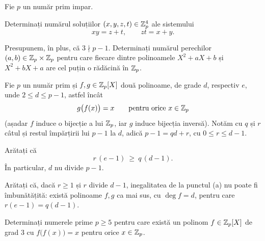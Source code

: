 \begin{problema}
Fie $p$ un număr prim impar.
\begin{parti}
\item Determinați numărul soluțiilor $(x,y,z,t) \in \mathbb{Z}_p^4$ ale sistemului
\[
  xy = z + t, \qquad zt = x + y .
\]
\item Presupunem, în plus, că $3 \nmid p-1$. Determinați numărul perechilor $(a,b) \in \mathbb{Z}_p \times \mathbb{Z}_p$ pentru care fiecare dintre polinoamele $X^2 + aX + b$ și $X^2 + bX + a$ are cel puțin o rădăcină în $\mathbb{Z}_p$.
\end{parti}
\end{problema}

\begin{problema}
Fie $p$ un număr prim și $f,g\in\mathbb{Z}_p[X]$ două polinoame, de grade $d$, respectiv $e$, unde $2\le d\le p-1$, astfel încât
\[
  g\bigl(f(x)\bigr)=x\qquad\text{pentru orice } x\in\mathbb{Z}_p
\]
(așadar $f$ induce o bijecție a lui $\mathbb{Z}_p$, iar $g$ induce bijecția inversă). Notăm cu $q$ și $r$ câtul și restul împărțirii lui $p-1$ la $d$, adică $p-1=qd+r$, cu $0\le r\le d-1$.
\begin{parti}
\item Arătați că
\[
  r\,(e-1)\ \ge\ q\,(d-1).
\]
În particular, $d$ nu divide $p-1$.
\item Arătați că, dacă $r\ge 1$ și $r$ divide $d-1$, inegalitatea de la punctul (a) nu poate fi îmbunătățită: există polinoame $f,g$ ca mai sus, cu $\deg f=d$, pentru care $r(e-1)=q(d-1)$.
\item Determinați numerele prime $p\ge 5$ pentru care există un polinom $f\in\mathbb{Z}_p[X]$ de grad $3$ cu $f\bigl(f(x)\bigr)=x$ pentru orice $x\in\mathbb{Z}_p$.
\end{parti}
\end{problema}
